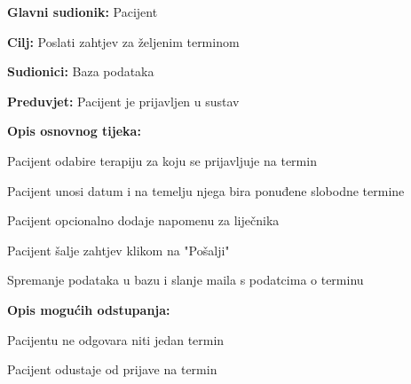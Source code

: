				\noindent {}
				\begin{packed_item}
					
					\item \textbf{Glavni sudionik: }Pacijent
					\item  \textbf{Cilj: }Poslati zahtjev za željenim terminom
					\item  \textbf{Sudionici: }Baza podataka
					\item  \textbf{Preduvjet: }Pacijent je prijavljen u sustav
					\item  \textbf{Opis osnovnog tijeka: }
					
					\item[] \begin{packed_enum}
						
						\item Pacijent odabire terapiju za koju se prijavljuje na termin
						\item Pacijent unosi datum i na temelju njega bira ponuđene slobodne termine
						\item Pacijent opcionalno dodaje napomenu za liječnika
						\item Pacijent šalje zahtjev klikom na "Pošalji"
						\item Spremanje podataka u bazu i slanje maila s podatcima o terminu
						
					\end{packed_enum}
					
					\item  \textbf{Opis mogućih odstupanja:}
					
					\item[] \begin{packed_item}
						\item[2.a] Pacijentu ne odgovara niti jedan termin
						\item[] \begin{packed_enum}
							
							\item Pacijent odustaje od prijave na termin
							
						\end{packed_enum}
						
					\end{packed_item}
				\end{packed_item}
				
			
				
